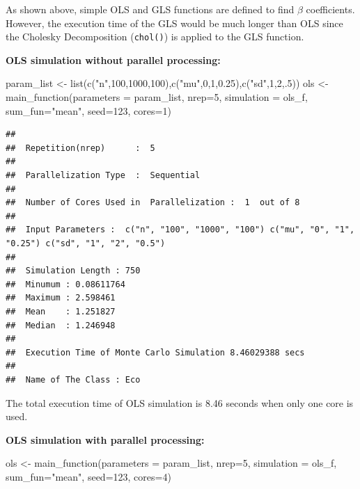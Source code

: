 \documentclass[11pt,a4paper]{article}
\newenvironment{Shaded}{\begin{snugshade}}{\end{snugshade}}
\newcommand{\AttributeTok}[1]{\textcolor[rgb]{0.77,0.63,0.00}{#1}}
\newcommand{\DecValTok}[1]{\textcolor[rgb]{0.00,0.00,0.81}{#1}}
\newcommand{\FloatTok}[1]{\textcolor[rgb]{0.00,0.00,0.81}{#1}}
\newcommand{\FunctionTok}[1]{\textcolor[rgb]{0.00,0.00,0.00}{#1}}
\newcommand{\NormalTok}[1]{#1}
\newcommand{\OtherTok}[1]{\textcolor[rgb]{0.56,0.35,0.01}{#1}}
\newcommand{\StringTok}[1]{\textcolor[rgb]{0.31,0.60,0.02}{#1}}
\begin{document}
As shown above, simple OLS and GLS functions are defined to find
\(\beta\) coefficients. However, the execution time of the GLS would be
much longer than OLS since the Cholesky Decomposition (\texttt{chol()})
is applied to the GLS function.

\textbf{OLS simulation without parallel processing:}

\begin{Shaded}
\begin{Highlighting}[]
\NormalTok{ param\_list }\OtherTok{\textless{}{-}} \FunctionTok{list}\NormalTok{(}\FunctionTok{c}\NormalTok{(}\StringTok{"n"}\NormalTok{,}\DecValTok{100}\NormalTok{,}\DecValTok{1000}\NormalTok{,}\DecValTok{100}\NormalTok{),}\FunctionTok{c}\NormalTok{(}\StringTok{"mu"}\NormalTok{,}\DecValTok{0}\NormalTok{,}\DecValTok{1}\NormalTok{,}\FloatTok{0.25}\NormalTok{),}\FunctionTok{c}\NormalTok{(}\StringTok{"sd"}\NormalTok{,}\DecValTok{1}\NormalTok{,}\DecValTok{2}\NormalTok{,.}\DecValTok{5}\NormalTok{))}
\NormalTok{ols }\OtherTok{\textless{}{-}} \FunctionTok{main\_function}\NormalTok{(}\AttributeTok{parameters =}\NormalTok{ param\_list,}
                     \AttributeTok{nrep=}\DecValTok{5}\NormalTok{,}
                     \AttributeTok{simulation =}\NormalTok{ ols\_f,}
                     \AttributeTok{sum\_fun=}\StringTok{"mean"}\NormalTok{,}
                     \AttributeTok{seed=}\DecValTok{123}\NormalTok{,}
                     \AttributeTok{cores=}\DecValTok{1}\NormalTok{)}
\end{Highlighting}
\end{Shaded}

\begin{verbatim}
## 
##  Repetition(nrep)      :  5 
## 
##  Parallelization Type  :  Sequential 
## 
##  Number of Cores Used in  Parallelization :  1  out of 8 
## 
##  Input Parameters :  c("n", "100", "1000", "100") c("mu", "0", "1", "0.25") c("sd", "1", "2", "0.5") 
## 
##  Simulation Length : 750 
##  Minumum : 0.08611764 
##  Maximum : 2.598461 
##  Mean    : 1.251827 
##  Median  : 1.246948 
## 
##  Execution Time of Monte Carlo Simulation 8.46029388 secs 
## 
##  Name of The Class : Eco
\end{verbatim}

The total execution time of OLS simulation is 8.46 seconds when only one
core is used.

\textbf{OLS simulation with parallel processing:}

\begin{Shaded}
\begin{Highlighting}[]
\NormalTok{ols }\OtherTok{\textless{}{-}} \FunctionTok{main\_function}\NormalTok{(}\AttributeTok{parameters =}\NormalTok{ param\_list,}
                     \AttributeTok{nrep=}\DecValTok{5}\NormalTok{,}
                     \AttributeTok{simulation =}\NormalTok{ ols\_f,}
                     \AttributeTok{sum\_fun=}\StringTok{"mean"}\NormalTok{,}
                     \AttributeTok{seed=}\DecValTok{123}\NormalTok{,}
                     \AttributeTok{cores=}\DecValTok{4}\NormalTok{)}
\end{Highlighting}
\end{Shaded}
\end{document}
